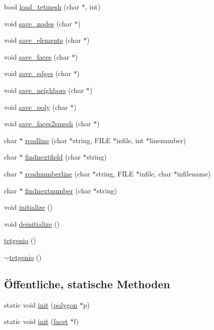 \begin{DoxyCompactItemize}
bool \hyperlink{classtetgenio_ae7f0c3300cec04c22b7659b27c5e3dae}{load\-\_\-tetmesh} (char $\ast$, int)
\item 
void \hyperlink{classtetgenio_a80500674e90ab22d30f1d56a9a15cd3c}{save\-\_\-nodes} (char $\ast$)
\item 
void \hyperlink{classtetgenio_a9201c6478b6e805091b548d5a31c9236}{save\-\_\-elements} (char $\ast$)
\item 
void \hyperlink{classtetgenio_a3a3cf78a000db81c949ebea34609a8a0}{save\-\_\-faces} (char $\ast$)
\item 
void \hyperlink{classtetgenio_aee72faff0abaf56e1b59596c29188828}{save\-\_\-edges} (char $\ast$)
\item 
void \hyperlink{classtetgenio_a1b3b4554c3ddfe5c93860aa5630eb762}{save\-\_\-neighbors} (char $\ast$)
\item 
void \hyperlink{classtetgenio_ac512604429e7c754f3128a94133babdd}{save\-\_\-poly} (char $\ast$)
\item 
void \hyperlink{classtetgenio_a5f74cc6e1f7264c70049cde809b083e2}{save\-\_\-faces2smesh} (char $\ast$)
\item 
char $\ast$ \hyperlink{classtetgenio_a085af1b2c889a6545f6aab67aad1ba43}{readline} (char $\ast$string, F\-I\-L\-E $\ast$infile, int $\ast$linenumber)
\item 
char $\ast$ \hyperlink{classtetgenio_ad181a411db5dbcb1e11af7641e268bd5}{findnextfield} (char $\ast$string)
\item 
char $\ast$ \hyperlink{classtetgenio_a5e59fa66b5f0f4a7b7aa72df554ac1c7}{readnumberline} (char $\ast$string, F\-I\-L\-E $\ast$infile, char $\ast$infilename)
\item 
char $\ast$ \hyperlink{classtetgenio_a9a30e99d63fb2288525cdbda2b887c38}{findnextnumber} (char $\ast$string)
\item 
void \hyperlink{classtetgenio_ac164a365a6a479bb31cd40443f5bd989}{initialize} ()
\item 
void \hyperlink{classtetgenio_afcc5a8855570b36717070f3f47e3ef2a}{deinitialize} ()
\item 
\hyperlink{classtetgenio_ad1fbb1c5d4dae0afc09b40eb498ca275}{tetgenio} ()
\item 
\hyperlink{classtetgenio_af54f8705453a9421aafd500ed9435d2a}{$\sim$tetgenio} ()
\end{DoxyCompactItemize}
\subsection*{Öffentliche, statische Methoden}
\begin{DoxyCompactItemize}
\item 
static void \hyperlink{classtetgenio_aca2fd0dcb29ee3cd313a74d55df2ff2c}{init} (\hyperlink{structtetgenio_1_1polygon}{polygon} $\ast$p)
\item 
static void \hyperlink{classtetgenio_a54b1b29c83d5c6e1466bbb087fe1f80e}{init} (\hyperlink{structtetgenio_1_1facet}{facet} $\ast$f)
\end{DoxyCompactItemize}
